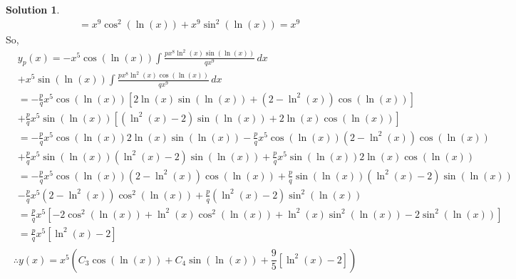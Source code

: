 \documentclass[10pt]{article}
\theoremstyle{definition}
\newtheorem{soln}{Solution}
\begin{document}
\begin{soln}
\begin{align*}
     & = x^9\cos^2\left(\ln(x)\right)+x^9\sin^2\left(\ln(x)\right) = x^9
  \end{align*}
  So,
  \begin{align*}
     & y_p(x)=-x^5\cos\left(\ln(x)\right)\int\frac{px^{8}\ln^2\left(x\right)\sin\left(\ln(x)\right)}{qx^9}\,dx                                                                 \\
     & +x^5\sin\left(\ln(x)\right)\int\frac{px^{8}\ln^2\left(x\right)\cos\left(\ln(x)\right)}{qx^9}\,dx                                                                        \\
     & =-\frac{p}{q}x^5\cos\left(\ln(x)\right)\left[2\ln(x)\sin\left(\ln(x)\right)+\left(2-\ln^2(x)\right)\cos\left(\ln(x)\right)\right]                                       \\
     & +\frac{p}{q}x^5\sin\left(\ln(x)\right)\left[\left(\ln^2(x)-2\right)\sin\left(\ln(x)\right)+2\ln(x)\cos\left(\ln(x)\right)\right]                                        \\
     & =-\frac{p}{q}x^5\cos\left(\ln(x)\right)2\ln(x)\sin\left(\ln(x)\right)-\frac{p}{q}x^5\cos\left(\ln(x)\right)\left(2-\ln^2(x)\right)\cos\left(\ln(x)\right)               \\
     & +\frac{p}{q}x^5\sin\left(\ln(x)\right)\left(\ln^2(x)-2\right)\sin\left(\ln(x)\right)+\frac{p}{q}x^5\sin\left(\ln(x)\right)2\ln(x)\cos\left(\ln(x)\right)                \\
     & = -\frac{p}{q}x^5\cos\left(\ln(x)\right)\left(2-\ln^2(x)\right)\cos\left(\ln(x)\right)+\frac{p}{q}\sin\left(\ln(x)\right)\left(\ln^2(x)-2\right)\sin\left(\ln(x)\right) \\
     & -\frac{p}{q}x^5\left(2-\ln^2(x)\right)\cos^2\left(\ln(x)\right)+\frac{p}{q}\left(\ln^2(x)-2\right)\sin^2\left(\ln(x)\right)                                             \\
     & = \frac{p}{q}x^5\left[-2\cos^2\left(\ln(x)\right)+\ln^2(x)\cos^2\left(\ln(x)\right)+\ln^2(x)\sin^2\left(\ln(x)\right)-2\sin^2\left(\ln(x)\right)\right]                 \\
     & = \frac{p}{q}x^5\left[\ln^2(x)-2\right]                                                                                                                                 \\
  \end{align*}
  $$\therefore y(x)=x^5\left(C_3\cos\left(\ln(x)\right)+C_4\sin\left(\ln(x)\right)+\frac{9}{5}\left[\ln^2(x)-2\right]\right) $$
\end{soln}
\end{document}
